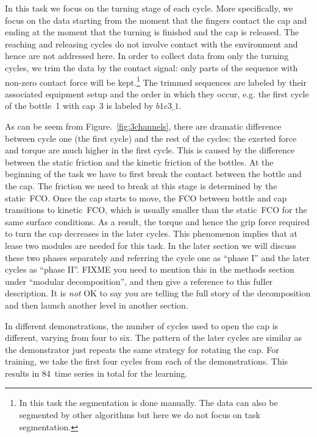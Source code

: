 In this task we focus on the turning stage of each cycle. More
specifically, we focus on the data starting from the moment that the
fingers contact the cap and ending at the moment that the turning is
finished and the cap is released. The reaching and releasing cycles do
not involve contact with the environment and hence are not addressed
here. 
In order to collect data from only the turning cycles, we trim the
data by the contact signal: only parts of the sequence with non-zero
contact force will be kept.\footnote{In this task the segmentation is
  done manually. The data can also be segmented by other algorithms
  but here we do not focus on task segmentation.} The trimmed
sequences are labeled by their associated equipment setup and the
order in which they occur, e.g. the first cycle of the bottle~1 with
cap~3 is labeled by $b1c3\_1$. 

As can be seem from Figure.~\ref{fig:3channels}, there are dramatic
difference between cycle one (the first cycle) and the rest of the
cycles: the exerted force and torque are much higher in the first
cycle. This is caused by the difference between the static friction
and the kinetic friction of the bottles. At the beginning of the task
we have to first break the contact between the bottle and the cap. The
friction we need to break at this stage is determined by the
static~FCO. Once the cap starts to move, the FCO between bottle and
cap transitions to kinetic~FCO, which is usually smaller than the
static~FCO for the same surface conditions. As a result, the torque and
hence the grip force required to turn the cap decreases in the later
cycles. This phenomenon implies that at lease two modules are needed
for this task. In the later section we will discuss these two phases
separately and referring the cycle one as ``phase I'' and the later cycles
as ``phase II''.  FIXME you need to mention this in the methods
section under ``modular decomposition'', and then give a reference to
this fuller description.  It is {\em not} OK to say you are telling
the full story of the decomposition and then launch another level in
another section. %

In different demonstrations, the number of cycles used to open the cap
is different, varying from four to six. The pattern of the later
cycles  are similar as the demonstrator just repeats the same strategy
for rotating the cap. For training, we take the first four cycles from
each of the demonstrations. This results in 84~time series in total for
the learning. 

